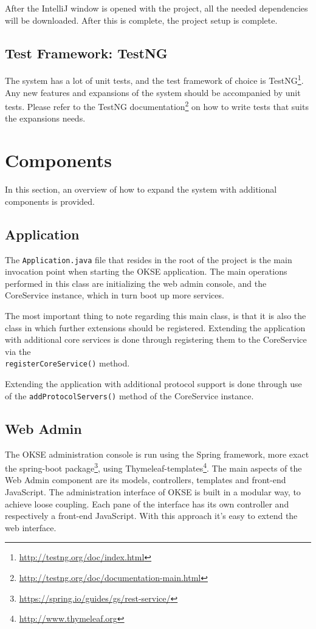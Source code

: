 After the IntelliJ window is opened with the project, all the needed dependencies will be downloaded. After this is complete, the project setup is complete.

\subsection{Test Framework: TestNG}
The system has a lot of unit tests, and the test framework of choice is TestNG\footnote{\url{http://testng.org/doc/index.html}}. Any new features and expansions of the system should be accompanied by unit tests. Please refer to the TestNG documentation\footnote{\url{http://testng.org/doc/documentation-main.html}} on how to write tests that suits the expansions needs.

\section{Components}
In this section, an overview of how to expand the system with additional components is provided.

\subsection{Application}

The \verb!Application.java! file that resides in the root of the project is the main invocation point when starting the OKSE application. The main operations performed in this class are initializing the web admin console, and the CoreService instance, which in turn boot up more services.

The most important thing to note regarding this main class, is that it is also the class in which further extensions should be registered. Extending the application with additional core services is done through registering them to the CoreService via the \\\verb!registerCoreService()! method.

Extending the application with additional protocol support is done through use of the \verb!addProtocolServers()! method of the CoreService instance.

\subsection{Web Admin}

The OKSE administration console is run using the Spring framework, more exact the spring-boot package\footnote{\url{https://spring.io/guides/gs/rest-service/}}, using Thymeleaf-templates\footnote{\url{http://www.thymeleaf.org}}. The main aspects of the Web Admin component are its models, controllers, templates and front-end JavaScript. The administration interface of OKSE is built in a modular way, to achieve loose coupling. Each pane of the interface has its own controller and respectively a front-end JavaScript.  With this approach it's easy to extend the web interface.

